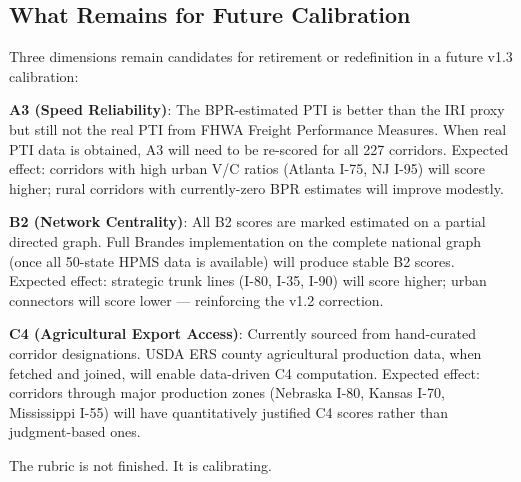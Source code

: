 \subsection*{What Remains for Future Calibration}

Three dimensions remain candidates for retirement or redefinition in a future v1.3 calibration:

\textbf{A3 (Speed Reliability)}: The BPR-estimated PTI is better than the IRI proxy but still not the real PTI from FHWA Freight Performance Measures. When real PTI data is obtained, A3 will need to be re-scored for all 227 corridors. Expected effect: corridors with high urban V/C ratios (Atlanta I-75, NJ I-95) will score higher; rural corridors with currently-zero BPR estimates will improve modestly.

\textbf{B2 (Network Centrality)}: All B2 scores are marked estimated on a partial directed graph. Full Brandes implementation on the complete national graph (once all 50-state HPMS data is available) will produce stable B2 scores. Expected effect: strategic trunk lines (I-80, I-35, I-90) will score higher; urban connectors will score lower --- reinforcing the v1.2 correction.

\textbf{C4 (Agricultural Export Access)}: Currently sourced from hand-curated corridor designations. USDA ERS county agricultural production data, when fetched and joined, will enable data-driven C4 computation. Expected effect: corridors through major production zones (Nebraska I-80, Kansas I-70, Mississippi I-55) will have quantitatively justified C4 scores rather than judgment-based ones.

The rubric is not finished. It is calibrating.
